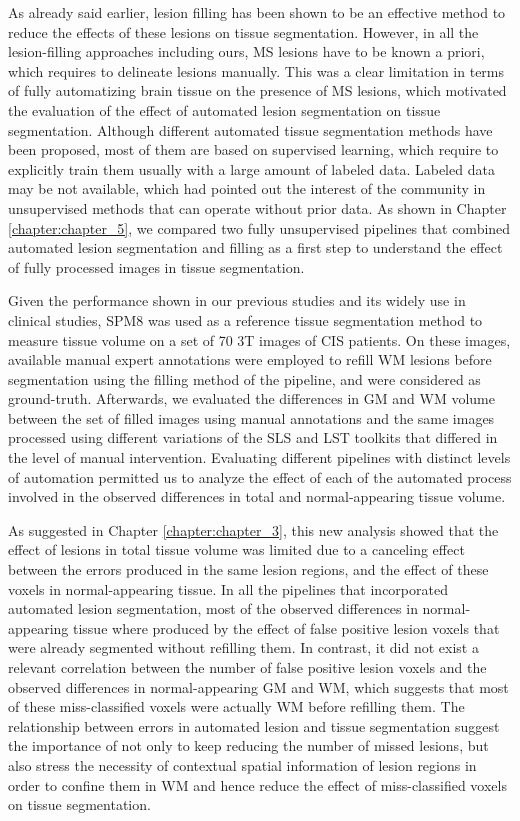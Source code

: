 As already said earlier, lesion filling has been shown to be an effective method to reduce the effects of these lesions on tissue segmentation. However, in all the lesion-filling approaches including ours, MS lesions have to be known a priori, which requires to delineate lesions manually. This was a clear limitation in terms of fully automatizing brain tissue on the presence of MS lesions, which motivated the evaluation of the effect of automated lesion segmentation on tissue segmentation. Although different automated tissue segmentation methods have been proposed, most of them are based on supervised learning, which require to explicitly train them usually with a large amount of labeled data. Labeled data may be not available, which had pointed out the interest of the community in unsupervised methods that can operate without prior data. As shown in Chapter \ref{chapter:chapter_5}, we compared two fully unsupervised pipelines that combined automated lesion segmentation and filling as a first step to understand the effect of fully processed images in tissue segmentation. 
 
Given the performance shown in our previous studies and its widely use in clinical studies, SPM8 was used as a reference tissue segmentation method to measure tissue volume on a set of 70 3T images of CIS patients. On these images, available manual expert annotations were employed to refill WM lesions before segmentation using the filling method of the pipeline, and were considered as ground-truth. Afterwards, we evaluated the differences in GM and WM volume between the set of filled images using manual annotations and the same images processed using different variations of the SLS and LST toolkits that differed in the level of manual intervention.  Evaluating different pipelines with distinct levels of automation  permitted us to analyze the effect of each of the automated process involved in the observed differences in total and normal-appearing tissue volume.  

As suggested in Chapter \ref{chapter:chapter_3}, this new analysis showed that the effect of lesions in total tissue volume was limited due to a canceling effect between the errors produced in the same lesion regions, and the effect of these voxels in normal-appearing tissue. In all the pipelines that incorporated automated lesion segmentation, most of the observed differences in normal-appearing tissue where produced by the effect of false positive lesion voxels that were already segmented without refilling them. In contrast, it did not exist a relevant correlation between the number of false positive lesion voxels and the observed differences in normal-appearing GM and WM, which suggests that most of these miss-classified voxels were actually WM before refilling them. The relationship between errors in automated lesion and tissue segmentation suggest the importance of not only to keep reducing the number of missed lesions, but also stress the necessity of contextual spatial information of lesion regions in order to confine them in WM and hence reduce the effect of miss-classified voxels on tissue segmentation.

